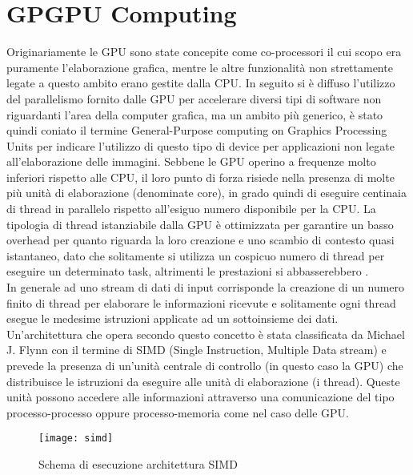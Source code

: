 \section{GPGPU Computing}

Originariamente le GPU sono state concepite come co-processori il cui scopo
era puramente l'elaborazione grafica, mentre le altre funzionalità
non strettamente legate a questo ambito erano gestite dalla CPU.
In seguito si è diffuso l'utilizzo del parallelismo fornito dalle GPU
per accelerare diversi tipi di software non riguardanti
l'area della computer grafica, ma un ambito più generico, è stato
quindi coniato il termine General-Purpose computing on Graphics Processing
Units per indicare l'utilizzo di questo tipo di device per applicazioni non
legate all'elaborazione delle immagini.
Sebbene le GPU operino a frequenze molto inferiori rispetto alle CPU, il loro
punto di forza risiede nella presenza di molte più unità di elaborazione
(denominate core), in grado quindi di eseguire centinaia di thread in parallelo
rispetto all'esiguo numero disponibile per la CPU. La tipologia di thread
istanziabile dalla GPU è ottimizzata per garantire un basso overhead
per quanto riguarda la loro creazione e uno scambio di contesto quasi
istantaneo, dato che solitamente si utilizza un cospicuo numero di thread
per eseguire un determinato task, altrimenti le prestazioni si abbasserebbero
\cite{kirk2007nvidia}.
\\
In generale ad uno stream di dati di input corrisponde la creazione di un
numero finito di thread per elaborare le informazioni ricevute e solitamente
ogni thread esegue le medesime istruzioni applicate ad un sottoinsieme
dei dati. Un'architettura che opera secondo questo concetto è stata
classificata da Michael J. Flynn con il termine di SIMD
(Single Instruction, Multiple Data stream)\cite{duncan1990survey} e prevede
la presenza di un'unità centrale di controllo (in questo caso la GPU) che
distribuisce le istruzioni da eseguire alle unità di elaborazione (i thread).
Queste unità possono accedere alle informazioni attraverso una comunicazione
del tipo processo-processo oppure processo-memoria come nel caso delle GPU.

\begin{figure}[H]
    \centering
    \texttt{[image: simd]}
    \caption{Schema di esecuzione architettura SIMD\cite{duncan1990survey}}
\end{figure}

